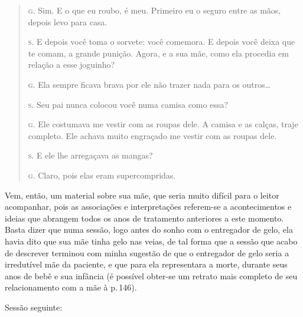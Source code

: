 \begin{quote}
\noindent\hskip0mm\textsc{g.} Sim. E o que eu roubo, é meu. Primeiro eu o seguro entre as mãos,
depois levo para casa.

\noindent\hskip0mm\textsc{s.} E depois você toma o sorvete: você comemora. E depois você deixa que
te comam, a grande punição. Agora, e a sua mãe, como ela procedia em
relação a esse joguinho?

\noindent\hskip0mm\textsc{g.} Ela sempre ficava brava por ele não trazer nada para os outros\ldots{}

\noindent\hskip0mm\textsc{s.} Seu pai nunca colocou você numa camisa como essa?

\noindent\hskip0mm\textsc{g.} Ele costumava me vestir com as roupas dele. A camisa e as calças,
traje completo. Ele achava muito engraçado me vestir com as roupas
dele.

\noindent\hskip0mm\textsc{s.} E ele lhe arregaçava as mangas?

\noindent\hskip0mm\textsc{g.} Claro, pois elas eram supercompridas.

\end{quote}

\bigskip

Vem, então, um material sobre sua mãe, que seria muito difícil para
o leitor acompanhar, pois as associações e interpretações referem-se a
acontecimentos e ideias que abrangem todos os anos de tratamento
anteriores a este momento. Basta dizer que numa sessão, logo antes do
sonho com o entregador de gelo, ela havia dito que sua mãe tinha gelo
nas veias, de tal forma que a sessão que acabo de descrever terminou
com minha sugestão de que o entregador de gelo seria a irredutível mãe
da paciente, e que para ela representara a morte, durante seus anos de
bebê e sua infância (é possível obter-se um retrato mais completo de
seu relacionamento com a mãe à p.\,146).

Sessão seguinte:

\bigskip

